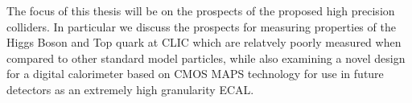 The focus of this thesis will be on the prospects of the proposed high precision colliders. In particular we discuss the prospects for measuring properties of the Higgs Boson and Top quark at \ac{CLIC} which are relatvely poorly measured when compared to other standard model particles, while also examining a novel design for a digital calorimeter based on \ac{CMOS} \ac{MAPS} technology for use in future detectors as an extremely high granularity \ac{ECAL}.  


 
